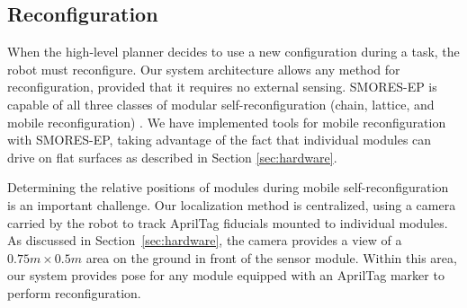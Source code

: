 \documentclass[journal]{IEEEtran}
\newcommand{\TODO}[1]{ {\bf \textcolor{red}{TODO:} #1 }}
\begin{document}
\subsection{Reconfiguration}
\label{sec:reconfiguration}
%
When the high-level planner decides to use a new configuration during a task, the robot must reconfigure. Our system architecture allows any method for reconfiguration, provided that it requires no external sensing. SMORES-EP is capable of all three classes of modular self-reconfiguration (chain, lattice, and mobile reconfiguration) \cite{Davey2012,yim2003modular}.  We have implemented tools for mobile reconfiguration with SMORES-EP, taking advantage of the fact that individual modules can drive on flat surfaces as described in Section \ref{sec:hardware}.

Determining the relative positions of modules during mobile self-reconfiguration is an important challenge. 
Our localization method is centralized, using a camera carried by the robot to track AprilTag fiducials mounted to individual modules.
As discussed in Section~\ref{sec:hardware}, the camera provides a view of a $0.75m\times0.5m$ area on the ground in front of the sensor module.  
Within this area, our system provides pose for any module equipped with an AprilTag marker to perform reconfiguration. 
\end{document}
